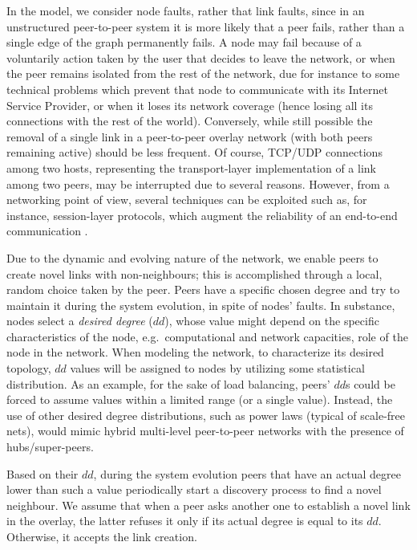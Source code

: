 \documentclass[a4paper,twosided]{article}
\begin{document}
In the model, we consider node faults, rather that link faults,
since in an unstructured peer-to-peer system it is more likely that a peer fails, rather than a single edge of the graph permanently fails. A node may fail because of a voluntarily action taken by the user that decides to leave the network, or when the peer remains isolated from the rest of the network, due for instance to some technical problems which prevent that node to communicate with its Internet Service Provider, or when it loses its network coverage (hence losing all its connections with the rest of the world). 
Conversely, while still possible the removal of a single link in a peer-to-peer overlay network (with both peers remaining active) should be less frequent. Of course, TCP/UDP connections among two hosts, representing the transport-layer implementation of a link among two peers, may be interrupted due to several reasons. However, from a networking point of view, several techniques can be exploited such as, for instance,
session-layer protocols, which augment the reliability of an end-to-end communication 
\cite{aict,disio_ghini}.

Due to the dynamic and evolving nature of the network, we enable peers to create novel links with non-neighbours; this is accomplished through a local, random choice taken by the peer. 
Peers have a specific chosen degree and try to maintain it during the system evolution, in spite of nodes' faults. In substance, nodes select a \emph{desired degree} ($dd$), whose value
might depend on the specific characteristics of the node, e.g.~computational and network capacities, role of the node in the network. 
When modeling the network, to characterize its desired topology, $dd$ values will be assigned to nodes by utilizing some statistical distribution. As an example, for the sake of load balancing, 
peers' $dd$s could be forced to assume values within a limited range (or a single value). Instead, the use of other desired degree distributions, such as power laws (typical of scale-free nets), would mimic hybrid multi-level peer-to-peer networks with the presence of hubs/super-peers.

Based on their $dd$, during the system evolution peers that have an actual degree lower than such a value periodically start a discovery process to find a novel neighbour. We assume that when a peer asks another one to establish a novel link in the overlay, the latter refuses it only if its actual degree is equal to its $dd$. Otherwise, it accepts the link creation.
\end{document}
